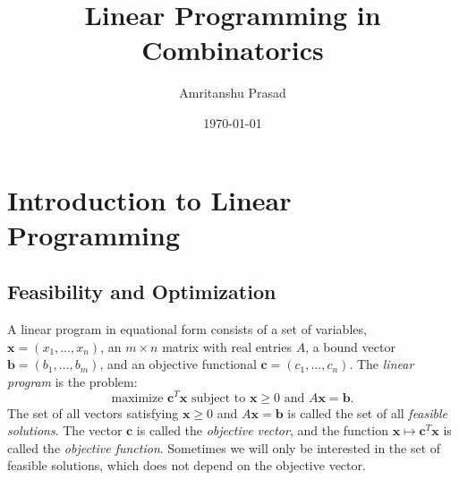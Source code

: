 \documentclass{amsbook}
\newcommand{\xx}{\mathbf x}
\newcommand{\cc}{\mathbf c}
\newcommand{\bb}{\mathbf b}
\theoremstyle{definition}
\theoremstyle{remark}
\begin{document}
\title{Linear Programming in Combinatorics}
\author{Amritanshu Prasad}
\address{The Institute of Mathematical Sciences, Chennai.}
\address{Homi Bhabha National Institute, Mumbai.}
\date{\today}
\maketitle
\chapter{Introduction to Linear Programming}
\label{cha:intro-lp}
\section{Feasibility and Optimization}
\label{sec:feas-opt}
A linear program in equational form consists of a set of variables, $\xx=(x_1,\dotsc,x_n)$, an $m\times n$ matrix with real entries $A$, a bound vector $\bb=(b_1,\dotsc,b_m)$, and an objective functional $\cc = (c_1,\dotsc,c_n)$.
The \emph{linear program} is the problem:
\begin{equation}
  \label{eq:lp-problem}
  \text{maximize $\cc^T\xx$ subject to $\xx\geq 0$ and $A\xx=\bb$}.
\end{equation}
The set of all vectors satisfying $\xx\geq 0$ and $A\xx=\bb$ is called the set of all \emph{feasible solutions}.
The vector $\cc$ is called the \emph{objective vector}, and the function $\xx\mapsto \cc^T\xx$ is called the \emph{objective function}.
Sometimes we will only be interested in the set of feasible solutions, which does not depend on the objective vector.
\end{document}
